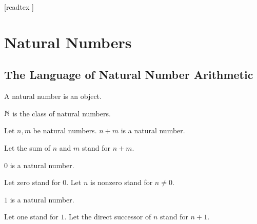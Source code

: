 \documentclass[10pt]{article}
\begin{document}
  \begin{imports}
    \begin{forthel}
      [readtex ]
    \end{forthel}
  \end{imports}


  \section*{Natural Numbers}

  \subsection*{The Language of Natural Number Arithmetic}

  \begin{forthel}
    \begin{signature}
      A natural number is an object.
    \end{signature}
  \end{forthel}

  \begin{forthel}
    \begin{definition}
      $\mathbb{N}$ is the class of natural numbers.
    \end{definition}
  \end{forthel}

  \begin{forthel}
    \begin{signature}
      Let $n, m$ be natural numbers.
      $n + m$ is a natural number.
    \end{signature}

    Let the sum of $n$ and $m$ stand for $n + m$.
  \end{forthel}

  \begin{forthel}
    \begin{signature}
      $0$ is a natural number.
    \end{signature}

    Let zero stand for $0$.
    Let $n$ is nonzero stand for $n \neq 0$.
  \end{forthel}

  \begin{forthel}
    \begin{signature}
      $1$ is a natural number.
    \end{signature}

    Let one stand for $1$.
    Let the direct successor of $n$ stand for $n + 1$.
  \end{forthel}
  
\end{document}
